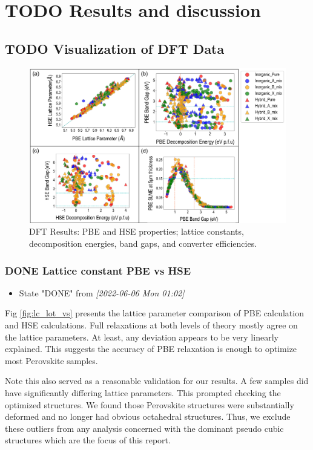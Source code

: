 \documentclass[twoside, twocolumn, 9pt, draft]{article}
\begin{document}
\section*{{\bfseries\sffamily TODO} Results and discussion}
\label{sec:org99d48f0}
\subsection*{{\bfseries\sffamily TODO} Visualization of DFT Data}
\label{sec:org5194870}
\begin{figure}
\centering
\includegraphics[width=.9\linewidth]{Figure2.png}
\caption{\label{fig:pairplots} DFT Results: PBE and HSE properties; lattice constants, decomposition energies, band gaps, and converter efficiencies.}
\end{figure}

\subsubsection*{{\bfseries\sffamily DONE} Lattice constant PBE vs HSE}
\label{sec:orgbaa0db2}
\begin{itemize}
\item State "DONE"       from              \textit{[2022-06-06 Mon 01:02]}
\end{itemize}
Fig \ref{fig:lc_lot_vs} presents the lattice parameter comparison of PBE
calculation and HSE calculations. Full relaxations at both levels of
theory mostly agree on the lattice parameters. At least, any deviation
appears to be very linearly explained. This suggests the accuracy of
PBE relaxation is enough to optimize most Perovskite samples.

Note this also served as a reasonable validation for our results. A
few samples did have significantly differing lattice parameters. This
prompted checking the optimized structures. We found those Perovskite
structures were substantially deformed and no longer had obvious
octahedral structures. Thus, we exclude these outliers from any
analysis concerned with the dominant pseudo cubic structures which are
the focus of this report.
\end{document}
